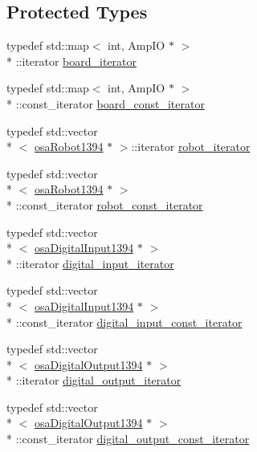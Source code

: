 \subsection*{Protected Types}
\begin{DoxyCompactItemize}
\item 
typedef std\-::map$<$ int, Amp\-I\-O $\ast$ $>$\\*
\-::iterator \hyperlink{classsaw_robot_i_o1394_1_1osa_port1394_ab2ec914caff42e3180aff52b41643292}{board\-\_\-iterator}
\item 
typedef std\-::map$<$ int, Amp\-I\-O $\ast$ $>$\\*
\-::const\-\_\-iterator \hyperlink{classsaw_robot_i_o1394_1_1osa_port1394_a31632fbc6a8e493a8a1e0e48208f43d0}{board\-\_\-const\-\_\-iterator}
\item 
typedef std\-::vector\\*
$<$ \hyperlink{classsaw_robot_i_o1394_1_1osa_robot1394}{osa\-Robot1394} $\ast$ $>$\-::iterator \hyperlink{classsaw_robot_i_o1394_1_1osa_port1394_a2e6156bdb43167b1dc7d3ff98fdb1761}{robot\-\_\-iterator}
\item 
typedef std\-::vector\\*
$<$ \hyperlink{classsaw_robot_i_o1394_1_1osa_robot1394}{osa\-Robot1394} $\ast$ $>$\\*
\-::const\-\_\-iterator \hyperlink{classsaw_robot_i_o1394_1_1osa_port1394_a2cfdedd5dac44343f9b00f40aeff218c}{robot\-\_\-const\-\_\-iterator}
\item 
typedef std\-::vector\\*
$<$ \hyperlink{classsaw_robot_i_o1394_1_1osa_digital_input1394}{osa\-Digital\-Input1394} $\ast$ $>$\\*
\-::iterator \hyperlink{classsaw_robot_i_o1394_1_1osa_port1394_a4915e713bba71fecf60a3a761a932485}{digital\-\_\-input\-\_\-iterator}
\item 
typedef std\-::vector\\*
$<$ \hyperlink{classsaw_robot_i_o1394_1_1osa_digital_input1394}{osa\-Digital\-Input1394} $\ast$ $>$\\*
\-::const\-\_\-iterator \hyperlink{classsaw_robot_i_o1394_1_1osa_port1394_ad95ebd8e21bd3394aaa54a24ba424d7c}{digital\-\_\-input\-\_\-const\-\_\-iterator}
\item 
typedef std\-::vector\\*
$<$ \hyperlink{classsaw_robot_i_o1394_1_1osa_digital_output1394}{osa\-Digital\-Output1394} $\ast$ $>$\\*
\-::iterator \hyperlink{classsaw_robot_i_o1394_1_1osa_port1394_a02c636b5e610f1124fe454a847b07847}{digital\-\_\-output\-\_\-iterator}
\item 
typedef std\-::vector\\*
$<$ \hyperlink{classsaw_robot_i_o1394_1_1osa_digital_output1394}{osa\-Digital\-Output1394} $\ast$ $>$\\*
\-::const\-\_\-iterator \hyperlink{classsaw_robot_i_o1394_1_1osa_port1394_a2a22e1e9b266acf2c80a05ebd1a774e5}{digital\-\_\-output\-\_\-const\-\_\-iterator}
\end{DoxyCompactItemize}

